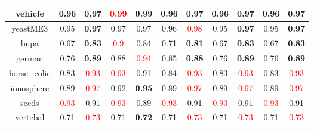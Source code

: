 \documentclass{article}%
\begin{document}
\begin{tabular}{c|cccccccccc}
\hline%
vehicle&0.96&\textbf{0.97}&\textcolor{red}{ 
0.99
}&0.99&0.96&\textbf{0.97}&0.96&\textbf{0.97}&0.96&\textbf{0.97}\\%
\hline%
yeastME3&0.95&\textbf{0.97}&0.97&0.97&0.96&\textcolor{red}{ 
0.98
}&0.95&\textbf{0.97}&0.95&\textbf{0.97}\\%
\hline%
bupa&0.67&\textbf{0.83}&\textcolor{red}{ 
0.9
}&0.84&0.71&\textbf{0.81}&0.67&\textbf{0.83}&0.67&\textbf{0.83}\\%
\hline%
german&0.76&\textbf{0.89}&0.88&\textcolor{red}{ 
0.94
}&0.85&\textbf{0.88}&0.76&\textbf{0.89}&0.76&\textbf{0.89}\\%
\hline%
horse\_colic&0.83&\textcolor{red}{ 
0.93
}&\textcolor{red}{ 
0.93
}&0.91&0.84&\textcolor{red}{ 
0.93
}&0.83&\textcolor{red}{ 
0.93
}&0.83&\textcolor{red}{ 
0.93
}\\%
\hline%
ionosphere&0.89&\textcolor{red}{ 
0.97
}&0.92&\textbf{0.95}&0.89&\textcolor{red}{ 
0.97
}&0.89&\textcolor{red}{ 
0.97
}&0.89&\textcolor{red}{ 
0.97
}\\%
\hline%
seeds&\textcolor{red}{ 
0.93
}&0.91&\textcolor{red}{ 
0.93
}&0.89&\textcolor{red}{ 
0.93
}&0.91&\textcolor{red}{ 
0.93
}&0.91&\textcolor{red}{ 
0.93
}&0.91\\%
\hline%
vertebal&0.71&\textcolor{red}{ 
0.73
}&0.71&\textbf{0.72}&0.71&\textcolor{red}{ 
0.73
}&0.71&\textcolor{red}{ 
0.73
}&0.71&\textcolor{red}{ 
0.73
}\\%
\hline%
\end{tabular}

%
\end{document}
